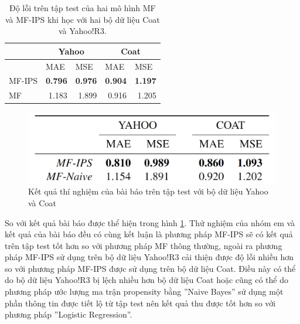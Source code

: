 \begin{table}[h]
    \centering
    \begin{tabular}{|l|rr|rr|}
    \hline
          & \multicolumn{2}{c|}{Yahoo}                                      & \multicolumn{2}{c|}{Coat}                                     \\ \hline
          & \multicolumn{1}{l|}{MAE}            & \multicolumn{1}{l|}{MSE} & \multicolumn{1}{l|}{MAE}            & \multicolumn{1}{l|}{MSE} 
        \\ \hline
    MF-IPS   & \multicolumn{1}{r|}{\textbf{0.796}} & \textbf{ 0.976}           & \multicolumn{1}{r|}{\textbf{0.904}} & \textbf{1.197}           
        \\ \hline
    MF & \multicolumn{1}{r|}{1.183}          &  1.899                    & \multicolumn{1}{r|}{0.916}          & 1.205  
        \\ \hline
    \end{tabular}
    \caption{Độ lỗi trên tập test của hai mô hình MF và MF-IPS khi học với hai bộ dữ liệu Coat và Yahoo!R3.}
    \label{table:4_implement}
\end{table}

\begin{figure}[h]
    \centering
    \includegraphics[width=\textwidth]{images/Chapter4/result.png}
    \caption{Kết quả thí nghiệm của bài báo trên tập test với bộ dữ liệu Yahoo và Coat}
    \label{fig:4_result}
\end{figure}



So với kết quả bài báo được thể hiện trong hình \ref{fig:4_result}. Thử nghiệm của nhóm em và kết quả của bài báo đều có cùng kết luận là phương pháp MF-IPS sẽ có kết quả trên tập test tốt hơn so với phương pháp MF thông thường, ngoài ra phương pháp MF-IPS sử dụng trên bộ dữ liệu Yahoo!R3 cải thiện được độ lỗi nhiều hơn so với phương pháp MF-IPS được sử dụng trên bộ dữ liệu Coat. Điều này có thể do bộ dữ liệu Yahoo!R3 bị lệch nhiều hơn bộ dữ liệu Coat hoặc cũng có thể do phương pháp ước lượng ma trận propensity bằng ''Naive Bayes'' sử dụng một phần thông tin được tiết lộ từ tập test nên kết quả thu được tốt hơn so với phương pháp ''Logistic Regression''. 

